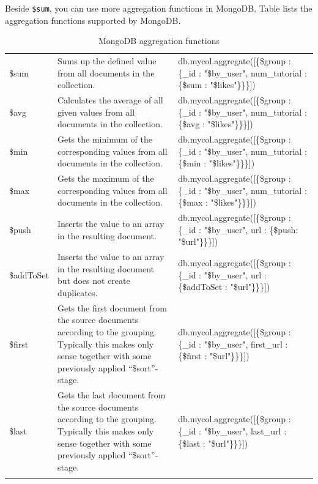 \documentclass[12pt]{article}
\begin{document}
\begin{bashcode}
\begin{bashcode}
Beside \verb=$sum=, you can use more aggregation functions in MongoDB.
Table  lists the aggregation functions supported by MongoDB.

\begin{table}[H]
\centering
\begin{threeparttable}
  \begin{tabular}{lp{12em}p{16em}}
  \toprule
  \thead{\bfseries Expression} & \thead{\bfseries Description} & \thead{\bfseries Example} \\
  \midrule
\$sum &   Sums up the defined value from all documents in the collection. & db.mycol.aggregate([\{\$group : \{\_id : "\$by\_user", num\_tutorial : \{\$sum : "\$likes"\}\}\}]) \\
\$avg &   Calculates the average of all given values from all documents in the collection. & db.mycol.aggregate([\{\$group : \{\_id : "\$by\_user", num\_tutorial : \{\$avg : "\$likes"\}\}\}]) \\
\$min &   Gets the minimum of the corresponding values from all documents in the collection. &  db.mycol.aggregate([\{\$group : \{\_id : "\$by\_user", num\_tutorial : \{\$min : "\$likes"\}\}\}]) \\
\$max &   Gets the maximum of the corresponding values from all documents in the collection.  & db.mycol.aggregate([\{\$group : \{\_id : "\$by\_user", num\_tutorial : \{\$max : "\$likes"\}\}\}]) \\
\$push &  Inserts the value to an array in the resulting document.   &  db.mycol.aggregate([\{\$group : \{\_id : "\$by\_user", url : \{\$push: "\$url"\}\}\}]) \\
\$addToSet &  Inserts the value to an array in the resulting document but does not create duplicates. & db.mycol.aggregate([\{\$group : \{\_id : "\$by\_user", url : \{\$addToSet : "\$url"\}\}\}]) \\
\$first & Gets the first document from the source documents according to the grouping. Typically this makes only sense together with some previously applied “\$sort”-stage. &   db.mycol.aggregate([\{\$group : \{\_id : "\$by\_user", first\_url : \{\$first : "\$url"\}\}\}]) \\
\$last &  Gets the last document from the source documents according to the grouping. Typically this makes only sense together with some previously applied “\$sort”-stage.  &   db.mycol.aggregate([\{\$group : \{\_id : "\$by\_user", last\_url : \{\$last : "\$url"\}\}\}]) \\
  \bottomrule\addlinespace[1ex]
\end{tabular}
\end{threeparttable}
  \caption{MongoDB aggregation functions}
  \label{tab:mongo-aggregate-functions}
\end{table}


\end{bashcode}
\end{bashcode}
\end{document}
